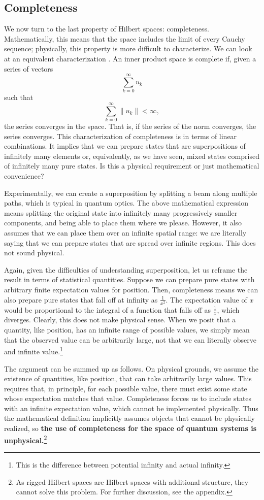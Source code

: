 \documentclass[10pt,twocolumn, nofootinbib]{revtex4-2}
\begin{document}
\subsection{Completeness}

We now turn to the last property of Hilbert spaces: completeness. Mathematically, this means that the space includes the limit of every Cauchy sequence; physically, this property is more difficult to characterize. We can look at an equivalent characterization \cite[Theorem 13.8]{roman_2008}. An inner product space is complete if, given a series of vectors
$$ \sum _{k=0}^{\infty }u_{k}$$
such that
$$ \sum _{k=0}^{\infty }\|u_{k}\|<\infty,$$
the series converges in the space. That is, if the series of the norm converges, the series converges. This characterization of completeness is in terms of linear combinations. It implies that we can prepare states that are superpositions of infinitely many elements or, equivalently, as we have seen, mixed states comprised of infinitely many pure states. Is this a physical requirement or just mathematical convenience?

Experimentally, we can create a superposition by splitting a beam along multiple paths, which is typical in quantum optics. The above mathematical expression means splitting the original state into infinitely many progressively smaller components, and being able to place them where we please. However, it also assumes that we can place them over an infinite spatial range: we are literally saying that we can prepare states that are spread over infinite regions. This does not sound physical.

Again, given the difficulties of understanding superposition, let us reframe the result in terms of statistical quantities. Suppose we can prepare pure states with arbitrary finite expectation values for position. Then, completeness means we can also prepare pure states that fall off at infinity as $\frac{1}{x^2}$. The expectation value of $x$ would be proportional to the integral of a function that falls off as $\frac{1}{x}$, which diverges. Clearly, this does not make physical sense. When we posit that a quantity, like position, has an infinite range of possible values, we simply mean that the observed value can be arbitrarily large, not that we can literally observe and infinite value.\footnote{This is the difference between potential infinity and actual infinity.}

The argument can be summed up as follows. On physical grounds, we assume the existence of quantities, like position, that can take arbitrarily large values. This requires that, in principle, for each possible value, there must exist some state whose expectation matches that value. Completeness forces us to include states with an infinite expectation value, which cannot be implemented physically. Thus the mathematical definition implicitly assumes objects that cannot be physically realized, so \textbf{the use of completeness for the space of quantum systems is unphysical.}\footnote{As rigged Hilbert spaces are Hilbert spaces with additional structure, they cannot solve this problem. For further discussion, see the appendix.}
\end{document}
